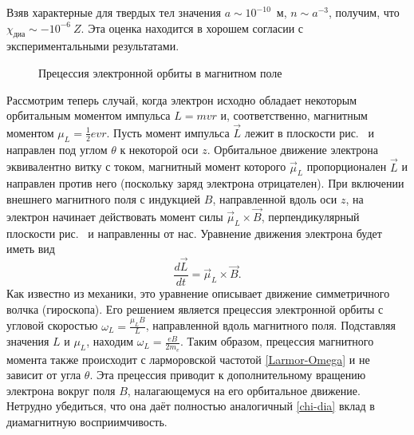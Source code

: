 Взяв характерные для твердых тел значения
$a \sim 10^{-10}$~м, $n\sim a^{-3}$, получим,
что $\chi_{диа} \sim -10^{-6}~Z$.
Эта оценка находится в хорошем согласии с экспериментальными результатами.

\begin{wrapfigure}[15]{r}{0.3\textwidth}
\centering
\caption{Прецессия электронной орбиты в магнитном поле}
\end{wrapfigure}

Рассмотрим теперь случай, когда электрон исходно обладает некоторым
орбитальным моментом импульса $L=mvr$ и, соответственно,
магнитным моментом $\mu_L= \frac12 e v r$.
Пусть момент импульса $\vec{L}$ лежит в плоскости
рис.~ и направлен под углом $\theta$ к некоторой оси $z$.
Орбитальное движение электрона эквивалентно витку с током,
магнитный момент которого $\vec{\mu}_L$ пропорционален $\vec{L}$
и направлен против него (поскольку заряд электрона отрицателен).
При включении внешнего магнитного поля с индукцией $B$,
направленной вдоль оси $z$, на электрон начинает
действовать момент силы $\vec{\mu}_L\times \vec{B}$,
перпендикулярный плоскости рис.~ и направленны от
нас. Уравнение движения электрона будет иметь вид
\begin{equation*}
	\frac{d\vec{L}}{dt} = \vec{\mu}_L\times \vec{B}.
\end{equation*}
Как известно из механики, это уравнение описывает движение симметричного волчка
(гироскопа). Его решением является
прецессия электронной орбиты с угловой скоростью
$\omega_{L} = \frac{\mu_L B}{L}$,
направленной вдоль магнитного поля.
Подставляя значения $L$ и $\mu_L$, находим
$\omega_L = \frac{eB}{2m_e}$.
Таким образом, прецессия магнитного момента также происходит с ларморовской частотой
\eqref{Larmor-Omega}
и не зависит от угла $\theta$. Эта прецессия приводит
к дополнительному вращению электрона вокруг поля $B$,
налагающемуся на его орбитальное движение. Нетрудно убедиться, что она
даёт полностью аналогичный \eqref{chi-dia} вклад в диамагнитную восприимчивость.


